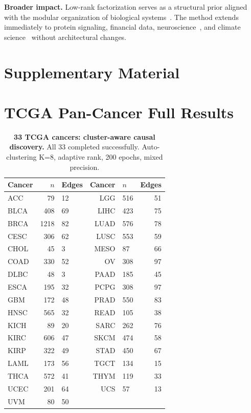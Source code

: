 \documentclass{article}
\theoremstyle{definition}
\begin{document}
\textbf{Broader impact.} Low-rank factorization serves as a structural prior aligned with the modular organization of biological systems~\citep{hanahan2011hallmarks,kanehisa2000kegg}. The method extends immediately to protein signaling, financial data, neuroscience~\citep{sporns2004organization}, and climate science~\citep{runge2019detecting} without architectural changes.

{\small


}

\newpage
\appendix
\raggedbottom
\section*{Supplementary Material}
\setcounter{section}{0}
\renewcommand{\thesection}{\Alph{section}}
\setcounter{figure}{0}
\renewcommand{\thefigure}{A\arabic{figure}}

\section{TCGA Pan-Cancer Full Results}
\label{app:tcga}

\begin{table}[H]
\centering
\caption{\textbf{33 TCGA cancers: cluster-aware causal discovery.} All 33 completed successfully. Auto-clustering K=8, adaptive rank, 200 epochs, mixed precision.}
\label{tab:tcga33}
\small
\begin{tabular}{lrlrlr}
\toprule
Cancer & $n$ & Edges & Cancer & $n$ & Edges \\
\midrule
ACC & 79 & 12 & LGG & 516 & 51 \\
BLCA & 408 & 69 & LIHC & 423 & 75 \\
BRCA & 1218 & 82 & LUAD & 576 & 78 \\
CESC & 306 & 62 & LUSC & 553 & 59 \\
CHOL & 45 & 3 & MESO & 87 & 66 \\
COAD & 330 & 52 & OV & 308 & 97 \\
DLBC & 48 & 3 & PAAD & 185 & 45 \\
ESCA & 195 & 32 & PCPG & 308 & 97 \\
GBM & 172 & 48 & PRAD & 550 & 83 \\
HNSC & 565 & 32 & READ & 105 & 38 \\
KICH & 89 & 20 & SARC & 262 & 76 \\
KIRC & 606 & 47 & SKCM & 474 & 58 \\
KIRP & 322 & 49 & STAD & 450 & 67 \\
LAML & 173 & 56 & TGCT & 134 & 15 \\
THCA & 572 & 41 & THYM & 119 & 33 \\
UCEC & 201 & 64 & UCS & 57 & 13 \\
UVM & 80 & 50 & & & \\
\bottomrule
\end{tabular}
\end{table}
\end{document}
